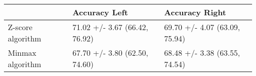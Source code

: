 \begin{tabular}{lll}
\toprule
{} &                  Accuracy Left &                 Accuracy Right \\
\midrule
Z-score algorithm &  71.02 +/- 3.67 (66.42, 76.92) &  69.70 +/- 4.07 (63.09, 75.94) \\
Minmax algorithm  &  67.70 +/- 3.80 (62.50, 74.60) &  68.48 +/- 3.38 (63.55, 74.54) \\
\bottomrule
\end{tabular}
